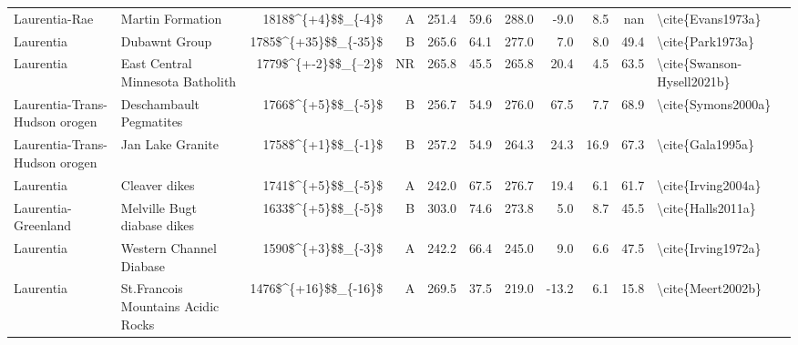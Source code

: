 \begin{longtable}{p{1 in}p{1 in}rrrrrrrr}
                 Laurentia-Rae &                                 Martin Formation &     1818\$\textasciicircum \{+4\}\$\$\_\{-4\}\$ &      A &     251.4 &      59.6 & 288.0 &  -9.0 &       8.5 &         nan &                                  \textbackslash cite\{Evans1973a\} \\
                     Laurentia &                                    Dubawnt Group &   1785\$\textasciicircum \{+35\}\$\$\_\{-35\}\$ &      B &     265.6 &      64.1 & 277.0 &   7.0 &       8.0 &        49.4 &                                   \textbackslash cite\{Park1973a\} \\
                     Laurentia &                 East Central Minnesota Batholith &   1779\$\textasciicircum \{+-2\}\$\$\_\{--2\}\$ &     NR &     265.8 &      45.5 & 265.8 &  20.4 &       4.5 &        63.5 &                         \textbackslash cite\{Swanson-Hysell2021b\} \\
 Laurentia-Trans-Hudson orogen &                          Deschambault Pegmatites &     1766\$\textasciicircum \{+5\}\$\$\_\{-5\}\$ &      B &     256.7 &      54.9 & 276.0 &  67.5 &       7.7 &        68.9 &                                 \textbackslash cite\{Symons2000a\} \\
 Laurentia-Trans-Hudson orogen &                                 Jan Lake Granite &     1758\$\textasciicircum \{+1\}\$\$\_\{-1\}\$ &      B &     257.2 &      54.9 & 264.3 &  24.3 &      16.9 &        67.3 &                                   \textbackslash cite\{Gala1995a\} \\
                     Laurentia &                                    Cleaver dikes &     1741\$\textasciicircum \{+5\}\$\$\_\{-5\}\$ &      A &     242.0 &      67.5 & 276.7 &  19.4 &       6.1 &        61.7 &                                 \textbackslash cite\{Irving2004a\} \\
           Laurentia-Greenland &                      Melville Bugt diabase dikes &     1633\$\textasciicircum \{+5\}\$\$\_\{-5\}\$ &      B &     303.0 &      74.6 & 273.8 &   5.0 &       8.7 &        45.5 &                                  \textbackslash cite\{Halls2011a\} \\
                     Laurentia &                          Western Channel Diabase &     1590\$\textasciicircum \{+3\}\$\$\_\{-3\}\$ &      A &     242.2 &      66.4 & 245.0 &   9.0 &       6.6 &        47.5 &                                 \textbackslash cite\{Irving1972a\} \\
                     Laurentia &               St.Francois Mountains Acidic Rocks &   1476\$\textasciicircum \{+16\}\$\$\_\{-16\}\$ &      A &     269.5 &      37.5 & 219.0 & -13.2 &       6.1 &        15.8 &                                  \textbackslash cite\{Meert2002b\} \\

\end{longtable}
